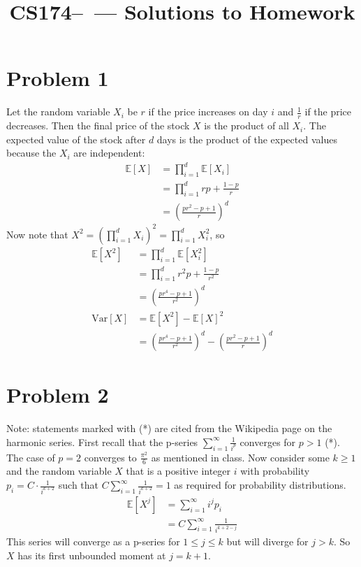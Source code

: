 \documentclass[11pt]{article}
\title{CS174--\Session\  --- Solutions to Homework \Homework}
\author{\Name}
\newcommand{\E}{\mathbb{E}}
\newcommand{\Var}{\text{Var}}
\newcommand{\asdf}{\newline\newline}
\begin{document}
\maketitle
{}
\setcounter{problemnumber}{0}

\section*{Problem 1}
Let the random variable $X_i$ be $r$ if the price increases on day $i$ and $\frac1r$ if the price decreases. Then the final price of the stock $X$ is the product of all $X_i$. The expected value of the stock after $d$ days is the product of the expected values because the $X_i$ are independent: \begin{align*}
\E[X] &= \prod_{i=1}^d \E[X_i]\\
&= \prod_{i=1}^d rp+\frac{1-p}r\\
&= (\frac{pr^2-p+1}r)^d
\end{align*}
Now note that $X^2=(\prod_{i=1}^d X_i)^2=\prod_{i=1}^d X_i^2$, so \begin{align*}
\E[X^2] &= \prod_{i=1}^d \E[X_i^2]\\
&= \prod_{i=1}^d r^2p+\frac{1-p}{r^2}\\
&= (\frac{pr^4-p+1}{r^2})^d\\
\Var[X] &= \E[X^2]-\E[X]^2\\
&= (\frac{pr^4-p+1}{r^2})^d - (\frac{pr^2-p+1}r)^d 
\end{align*}


\newpage
\section*{Problem 2}
Note: statements marked with (*) are cited from the Wikipedia page on the harmonic series.\asdf
First recall that the p-series $\sum_{i=1}^{\infty} \frac1{i^p}$ converges for $p>1$ (*). The case of $p=2$ converges to $\frac{\pi^2}6$ as mentioned in class. Now consider some $k\geq1$ and the random variable $X$ that is a positive integer $i$ with probability $p_i=C\cdot\frac1{i^{k+2}}$ such that $C\sum_{i=1}^{\infty} \frac1{i^{k+2}}= 1$ as required for probability distributions. \begin{align*}
\E[X^j] &= \sum_{i=1}^{\infty} i^jp_i\\
&= C\sum_{i=1}^{\infty} \frac1{i^{k+2-j}}
\end{align*}
This series will converge as a p-series for $1\leq j\leq k$ but will diverge for $j>k$. So $X$ has its first unbounded moment at $j=k+1$.
\end{document}
